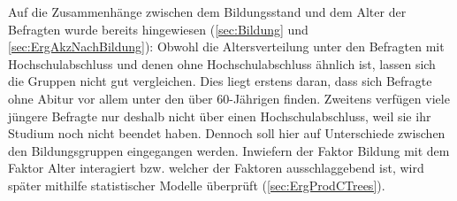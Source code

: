 Auf die Zusammenhänge zwischen dem Bildungsstand und dem Alter der Befragten wurde bereits hingewiesen (\autoref{sec:Bildung} und \autoref{sec:ErgAkzNachBildung}): 
Obwohl die Altersverteilung unter den Befragten mit Hochschulabschluss und denen ohne Hochschulabschluss ähnlich ist, lassen sich die Gruppen nicht gut vergleichen. 
Dies liegt erstens daran, dass sich Befragte ohne Abitur vor allem unter den über 60-Jährigen finden. 
Zweitens verfügen viele jüngere Befragte nur deshalb nicht über einen Hochschulabschluss, weil sie ihr Studium noch nicht beendet haben. 
Dennoch soll hier auf Unterschiede zwischen den Bildungsgruppen eingegangen werden. 
Inwiefern der Faktor \glqq Bildung\grqq{} mit dem Faktor \glqq Alter\grqq{} interagiert bzw. welcher der Faktoren ausschlaggebend ist, wird später mithilfe statistischer Modelle überprüft (\autoref{sec:ErgProdCTrees}). 

